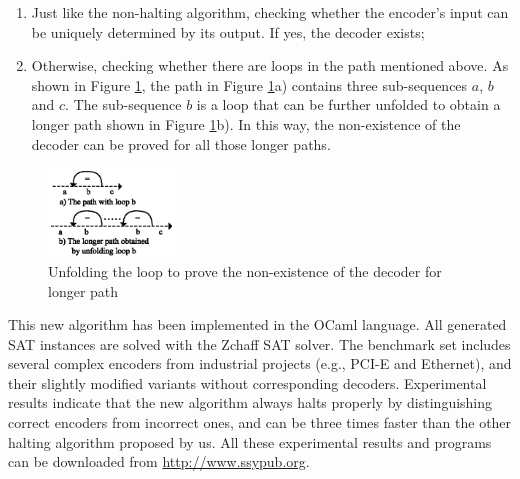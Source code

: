 \documentclass[journal]{IEEEtran}
\begin{document}
\begin{enumerate}
 \item Just like the non-halting algorithm\cite{ShengYuShen:iccad09,ShengYuShen:tcad},
       checking whether the encoder's input can be uniquely determined by its output.
      If yes, the decoder exists;
 \item Otherwise,
       checking whether there are loops in the path mentioned above.
       As shown in Figure \ref{doubleloop_unfold_cmp_simple},
       the path in Figure \ref{doubleloop_unfold_cmp_simple}a) contains three sub-sequences $a$, $b$ and $c$.
       The sub-sequence $b$ is a loop
       that can be further unfolded to obtain a longer path shown in Figure \ref{doubleloop_unfold_cmp_simple}b).
       In this way,
       the non-existence of the decoder can be proved for all those longer paths.
\end{enumerate}

\begin{figure}[b]
\begin{center}
\includegraphics[width=0.3\textwidth]{doubleloop_unfold_cmp_simple}
\end{center}
\caption{Unfolding the loop to prove the non-existence of the decoder for longer path}
  \label{doubleloop_unfold_cmp_simple}
\end{figure}

This new algorithm has been implemented in the OCaml language.
All generated SAT instances are solved with the Zchaff SAT solver\cite{CHAFF}.
The benchmark set includes several complex encoders from industrial projects
(e.g.,
PCI-E\cite{PCIESPEC} and Ethernet\cite{IEEE80232002}),
and their slightly modified variants without corresponding decoders.
Experimental results indicate that
the new algorithm always halts properly by distinguishing correct encoders from incorrect ones,
and can be three times faster than the other halting algorithm\cite{ShengYuShen:fmcad10} proposed by us.
All these experimental results and programs can be downloaded from \url{http://www.ssypub.org}.
\end{document}
